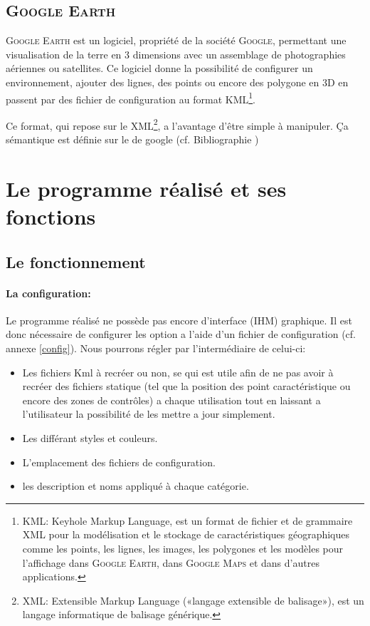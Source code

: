     \subsection{\textsc{Google Earth}}
\textsc{Google Earth} est un logiciel, propriété de la société \textsc{Google}, permettant une visualisation de la terre en 3 dimensions avec un assemblage de photographies aériennes ou satellites. Ce logiciel donne la possibilité de configurer un environnement, ajouter des lignes, des points ou encore des polygone en 3D en passent par des fichier de configuration au format KML\footnote{\label{Kml}KML: Keyhole Markup Language, est un format de fichier et de grammaire XML pour la modélisation et le stockage de caractéristiques géographiques comme les points, les lignes, les images, les polygones et les modèles pour l'affichage dans \textsc{Google Earth}, dans \textsc{Google Maps} et dans d'autres applications.}.

Ce format, qui repose sur le XML\footnote{XML: Extensible Markup Language («langage extensible de balisage»), est un langage informatique de balisage générique.}, a l'avantage d’être simple à manipuler. Ça sémantique est définie sur le de google (cf. Bibliographie \cite{gecode}) 



\section{Le programme réalisé et ses fonctions}
    \subsection{Le fonctionnement\label{fonctionnement}}
            \paragraph{La configuration:}
Le programme réalisé ne possède pas encore d'interface (IHM) graphique. Il est donc nécessaire de configurer les option a l'aide d'un fichier de configuration (cf. annexe \vref{config}). Nous pourrons régler par l'intermédiaire de celui-ci:
\begin{itemize}
    \item Les fichiers Kml à recréer ou non, se qui est utile afin de ne pas avoir à recréer des fichiers statique (tel que la position des point caractéristique ou encore des zones de contrôles) a chaque utilisation tout en laissant a l'utilisateur la possibilité de les mettre a jour simplement.
    \item Les différant styles et couleurs.
    \item L'emplacement des fichiers de configuration.
    \item les description et noms appliqué à chaque catégorie.
\end{itemize}\medskip
